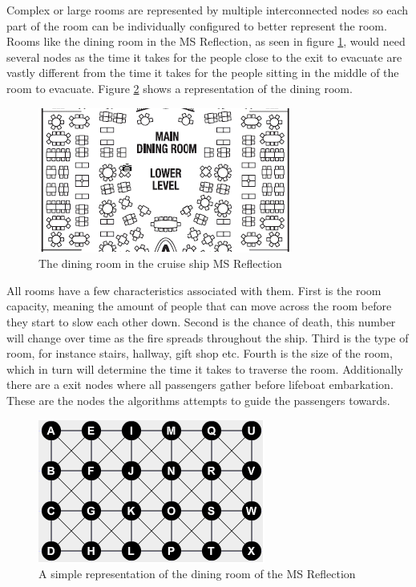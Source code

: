 Complex or large rooms are represented by multiple interconnected nodes so each part of the room can be individually configured to better represent the room. Rooms like the dining room in the MS Reflection, as seen in figure \ref{fig:dining}, would need several nodes as the time it takes for the people close to the exit to evacuate are vastly different from the time it takes for the people sitting in the middle of the room to evacuate. Figure \ref{fig:complex} shows a representation of the dining room. 

\begin{figure} [h]
\centering
\includegraphics{images/Dining.png}
\caption{The dining room in the cruise ship MS Reflection}
\label{fig:dining}
\end{figure}

All rooms have a few characteristics associated with them. First is the room capacity, meaning the amount of people that can move across the room before they start to slow each other down. Second is the chance of death, this number will change over time as the fire spreads throughout the ship. Third is the type of room, for instance stairs, hallway, gift shop etc. Fourth is the size of the room, which in turn will determine the time it takes to traverse the room. Additionally there are a exit nodes where all passengers gather before lifeboat embarkation. These are the nodes the algorithms attempts to guide the passengers towards.

\begin{figure} [h]
\centering
\includegraphics{images/complex.png}
\caption{A simple representation of the dining room of the MS Reflection}
\label{fig:complex}
\end{figure}

